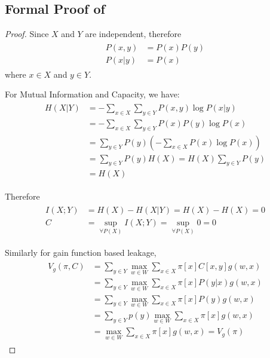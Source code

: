 \chapter{}

\section{Formal Proof of } \label{Prf: IR}
\begin{proof}
	Since $X$ and $Y$ are independent, therefore
	\begin{eqnarray*}
		\begin{aligned}
			P(x,y) &= P(x)P(y) \\
			P(x|y) &= P(x)
		\end{aligned}
	\end{eqnarray*}
	where $x \in X$ and $y \in Y$.

	For Mutual Information and Capacity, we have:
	\begin{eqnarray*}
		\begin{aligned}
			H(X|Y) 
			&= - \sum_{x \in X} \sum_{y \in Y} P(x,y)\log{P(x|y)} \\
			&= - \sum_{x \in X} \sum_{y \in Y} P(x)P(y)\log{P(x)} \\
			&= \sum_{y \in Y} P(y) (- \sum_{x \in X}P(x)\log{P(x)}) \\
			&= \sum_{y \in Y} P(y) H(X) = H(X) \sum_{y \in Y}{P(y)} \\
			&= H(X)
		\end{aligned}
	\end{eqnarray*}
	
	Therefore
	\begin{eqnarray*}
		\begin{aligned}
			I(X;Y) &= H(X) - H(X|Y) = H(X) - H(X) = 0 \\
			C &= \sup_{\forall P(X)} I(X;Y) = \sup_{\forall P(X)} 0 = 0
		\end{aligned}
	\end{eqnarray*}
	
	Similarly for gain function based leakage\cite{GLeakage},
	\begin{eqnarray*}
		\begin{aligned}
			V_{g}(\pi, C) 
			&= \sum_{y \in Y}{\max_{w \in W}\sum_{x \in X}{\pi[x]C[x,y]g(w,x)}} \\
			&= \sum_{y \in Y}{\max_{w \in W}\sum_{x \in X}{\pi[x]P(y|x)g(w,x)}} \\
			&= \sum_{y \in Y}{\max_{w \in W}\sum_{x \in X}{\pi[x]P(y)g(w,x)}} \\
			&= \sum_{y \in Y}p(y){\max_{w \in W}\sum_{x \in X}{\pi[x]g(w,x)}} \\
			&= \max_{w \in W}\sum_{x \in X}{\pi[x]g(w,x)} = V_{g}(\pi)
		\end{aligned}
	\end{eqnarray*}
	

\end{proof}
